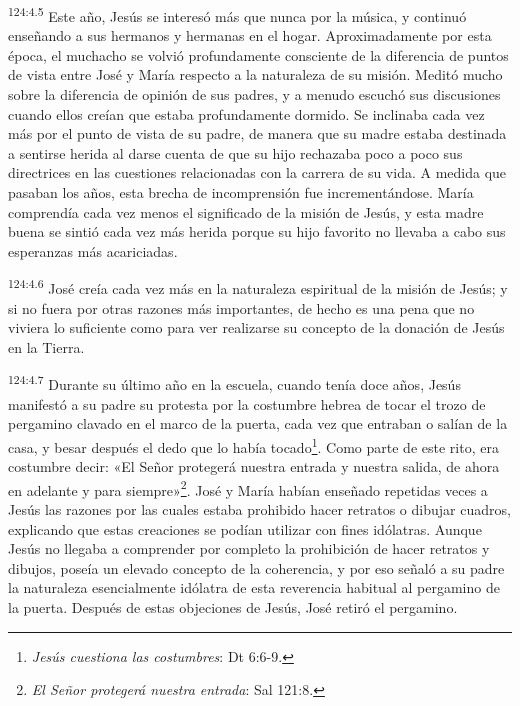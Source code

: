 \par 
\textsuperscript{124:4.5} Este año, Jesús se interesó más que nunca por la música, y continuó enseñando a sus hermanos y hermanas en el hogar. Aproximadamente por esta época, el muchacho se volvió profundamente consciente de la diferencia de puntos de vista entre José y María respecto a la naturaleza de su misión. Meditó mucho sobre la diferencia de opinión de sus padres, y a menudo escuchó sus discusiones cuando ellos creían que estaba profundamente dormido. Se inclinaba cada vez más por el punto de vista de su padre, de manera que su madre estaba destinada a sentirse herida al darse cuenta de que su hijo rechazaba poco a poco sus directrices en las cuestiones relacionadas con la carrera de su vida. A medida que pasaban los años, esta brecha de incomprensión fue incrementándose. María comprendía cada vez menos el significado de la misión de Jesús, y esta madre buena se sintió cada vez más herida porque su hijo favorito no llevaba a cabo sus esperanzas más acariciadas.

\par 
\textsuperscript{124:4.6} José creía cada vez más en la naturaleza espiritual de la misión de Jesús; y si no fuera por otras razones más importantes, de hecho es una pena que no viviera lo suficiente como para ver realizarse su concepto de la donación de Jesús en la Tierra.

\par 
\textsuperscript{124:4.7} Durante su último año en la escuela, cuando tenía doce años, Jesús manifestó a su padre su protesta por la costumbre hebrea de tocar el trozo de pergamino clavado en el marco de la puerta, cada vez que entraban o salían de la casa, y besar después el dedo que lo había tocado\footnote{\textit{Jesús cuestiona las costumbres}: Dt 6:6-9.}. Como parte de este rito, era costumbre decir: «El Señor protegerá nuestra entrada y nuestra salida, de ahora en adelante y para siempre»\footnote{\textit{El Señor protegerá nuestra entrada}: Sal 121:8.}. José y María habían enseñado repetidas veces a Jesús las razones por las cuales estaba prohibido hacer retratos o dibujar cuadros, explicando que estas creaciones se podían utilizar con fines idólatras. Aunque Jesús no llegaba a comprender por completo la prohibición de hacer retratos y dibujos, poseía un elevado concepto de la coherencia, y por eso señaló a su padre la naturaleza esencialmente idólatra de esta reverencia habitual al pergamino de la puerta. Después de estas objeciones de Jesús, José retiró el pergamino.

